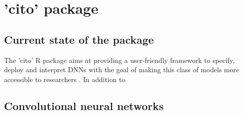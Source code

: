 \documentclass{article}
\begin{document}
\section{'cito' package}
\subsection{Current state of the package}
The 'cito' R package aims at providing a user-friendly framework to specify, deploy and interpret \acp{DNN} with the goal of making this class of models more accessible to researchers \citep{amesoderCitoPackageTraining2024}. In addition to
\subsection{Convolutional neural networks}
\end{document}
